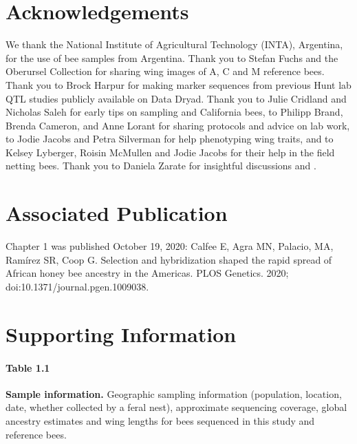 \section*{Acknowledgements}
We thank the National Institute of Agricultural Technology (INTA), Argentina, for the use of bee samples from Argentina. Thank you to Stefan Fuchs and the Oberursel Collection for sharing wing images of A, C and M reference bees. Thank you to Brock Harpur for making marker sequences from previous Hunt lab QTL studies publicly available on Data Dryad. Thank you to Julie Cridland and Nicholas Saleh for early tips on sampling and California bees, to Philipp Brand, Brenda Cameron, and Anne Lorant for sharing protocols and advice on lab work, to Jodie Jacobs and Petra Silverman for help phenotyping wing traits, and to Kelsey Lyberger, Roisin McMullen and Jodie Jacobs for their help in the field netting bees.  Thank you to Daniela Zarate for insightful discussions and .

\section*{Associated Publication}
Chapter 1 was published October 19, 2020: \newline
Calfee E, Agra MN, Palacio, MA, Ramírez SR, Coop G. Selection and hybridization shaped the rapid spread of African honey bee ancestry in the Americas. PLOS Genetics. 2020; \\doi:10.1371/journal.pgen.1009038.

\medskip

%


%

\newpage
\section*{Supporting Information}

\paragraph*{Table 1.1}
\label{table_bee_gps}
{\bf Sample information.} Geographic sampling information (population, location, date, whether collected by a feral nest), approximate sequencing coverage, global ancestry estimates and wing lengths for bees sequenced in this study and reference bees.

